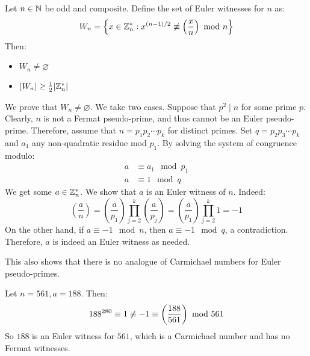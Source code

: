 \documentclass{article}
\begin{document}
\newpage
\begin{thm}
    Let $ n \in \mathbb{N} $ be odd and composite. Define the set of Euler witnesses for $ n $ as:
    \begin{equation*}
        W_{n} = \set{x \in \bb{Z}_{n}^{*} :
        x^{(n-1)/2} \cnot\equiv \left( \frac{x}{n} \right) \mod n}
    \end{equation*}
    Then:
    \begin{itemize}
        \item $ W_{n} \neq \varnothing $
        \item $ \abs{W_{n}} \geq \frac{1}{2} \abs{\mathbb{Z}_{n}^{*}} $
    \end{itemize}
\end{thm}

\begin{pf}[source=Primary Source Material]
    We prove that $ W_{n} \neq \varnothing $. We take two cases. \vsp
    Suppose that $ p^{2} \mid n $ for some prime $ p $.
    Clearly, $ n $ is not a Fermat pseudo-prime, and thus cannot be an Euler pseudo-prime.
    Therefore, assume that $ n = p_{1}p_{2}\cdots p_{k} $ for distinct primes. \vsp
    Set $ q = p_{2}p_{3}\cdots p_{k} $ and $ a_{1} $ any non-quadratic residue mod $ p_{1} $.
    By solving the system of congruence modulo:
    \begin{align*}
        a & \equiv a_{1} \mod p_{1} \\
        a & \equiv 1 \mod q
    \end{align*}
    We get some $ a \in \mathbb{Z}_{n}^{*} $. We show that $ a $ is an Euler witness of $ n $.
    Indeed:
    \begin{equation*}
        \left( \frac{a}{n} \right) = \left( \frac{a}{p_{1}} \right)
        \prod_{j=2}^{k} \left( \frac{a}{p_{j}} \right)
        = \left( \frac{a}{p_{1}} \right)\prod_{j=2}^{k} 1 = -1
    \end{equation*}
    On the other hand, if $ a \equiv -1 \mod n $, then $ a \equiv -1 \mod q $, a contradiction.
    Therefore, $ a $ is indeed an Euler witness as needed.
\end{pf}

This also shows that there is no analogue of Carmichael numbers for Euler pseudo-primes.

\begin{xmp}[source=Primary Source Material]
    Let $ n = 561, a = 188 $. Then:
    \begin{equation*}
        188^{280} \equiv 1 \cnot\equiv -1 \equiv \left( \frac{188}{561} \right) \mod 561
    \end{equation*}
    So $ 188 $ is an Euler witness for $ 561 $, which is a Carmichael number and has no
    Fermat witnesses.
\end{xmp}
\end{document}
